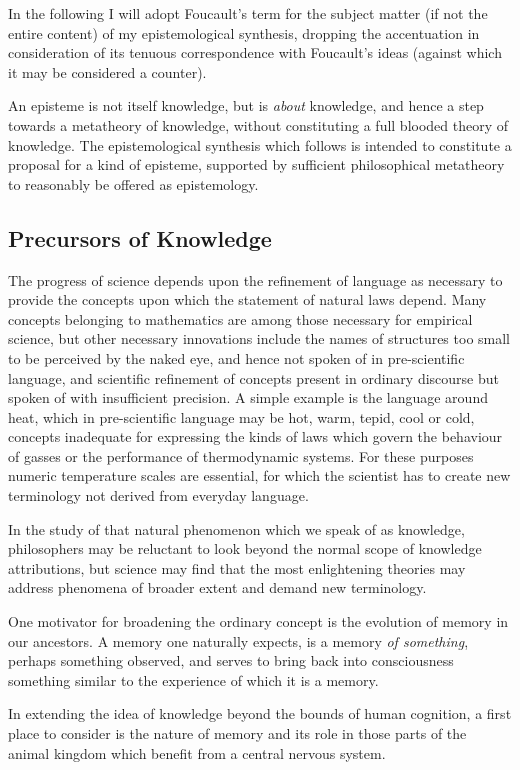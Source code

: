 \documentclass[10pt,titlepage]{book}
\begin{document}
In the following I will adopt Foucault's term for the subject matter (if not the entire content) of my epistemological synthesis, dropping the accentuation in consideration of its tenuous correspondence with Foucault's ideas (against which it may be considered a counter).

An episteme is not itself knowledge, but is \emph{about} knowledge, and hence a step towards a metatheory of knowledge, without constituting a full blooded theory of knowledge.
The epistemological synthesis which follows is intended to constitute a proposal for a kind of episteme, supported by sufficient philosophical metatheory to reasonably be offered as epistemology.

\subsection{Precursors of Knowledge}

The progress of science depends upon the refinement of language as necessary to provide the concepts upon which the statement of natural laws depend.
Many concepts belonging to  mathematics are among those necessary for empirical science, but other necessary innovations include the names of structures too small to be perceived by the naked eye, and hence not spoken of in pre-scientific language, and scientific refinement of concepts present in ordinary discourse but spoken of with insufficient precision.
A simple example is the language around heat, which in pre-scientific language may be hot, warm, tepid, cool or cold, concepts inadequate for expressing the kinds of laws which govern the behaviour of gasses or the performance of thermodynamic systems.
For these purposes numeric temperature scales are essential, for which the scientist has to create new terminology not derived from everyday language.

In the study of that natural phenomenon which we speak of as knowledge, philosophers may be reluctant to look beyond the normal scope of knowledge attributions, but science may find that the most enlightening theories may address phenomena of broader extent and demand new terminology.

One motivator for broadening the ordinary concept is the evolution of memory in our ancestors.
A memory one naturally expects, is a memory \emph{of something}, perhaps something observed, and serves to bring back into consciousness something similar to the experience of which it is a memory.


In extending the idea of knowledge beyond the bounds of human cognition, a first place to consider is the nature of memory and its role in those parts of the animal kingdom which benefit from a central nervous system.
\end{document}
